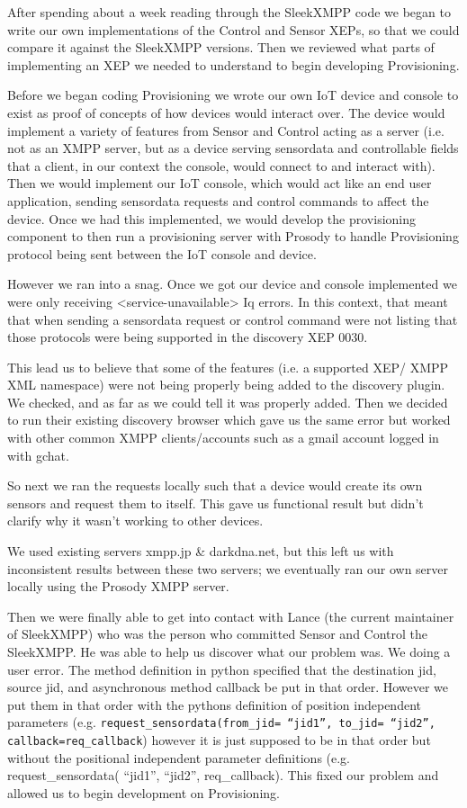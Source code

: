 After spending about a week reading through the SleekXMPP code we began to write
our own implementations of the Control and Sensor XEPs, so that we could compare
it against the SleekXMPP versions. Then we reviewed what parts of implementing
an XEP we needed to understand to begin developing Provisioning.

Before we began coding Provisioning we wrote our own IoT device and console to
exist as proof of concepts of how devices would interact over. The device would
implement a variety of features from Sensor and Control acting as a server (i.e.
not as an XMPP server, but as a device serving sensordata and controllable
fields that a client, in our context the console, would connect to and interact
with). Then we would implement our IoT console, which would act like an end user
application, sending sensordata requests and control commands to affect the
device. Once we had this implemented, we would develop the provisioning
component to then run a provisioning server with Prosody to handle Provisioning
protocol being sent between the IoT console and device.

However we ran into a snag. Once we got our device and console implemented we
were only receiving <service-unavailable> Iq errors. In this context, that meant
that when sending a sensordata request or control command were not listing that
those protocols were being supported in the discovery XEP 0030.

This lead us to believe that some of the features (i.e. a supported XEP/ XMPP
XML namespace)  were not being properly being added to the discovery plugin. We
checked, and as far as we could tell it was properly added. Then we decided to
run their existing discovery browser which gave us the same error but worked
with other common XMPP clients/accounts such as a gmail account logged in with
gchat.

So next we ran the requests locally such that a device would create its own
sensors and request them to itself. This gave us functional result but didn’t
clarify why it wasn’t working to other devices.

We used existing servers xmpp.jp \& darkdna.net, but this left us with
inconsistent results between these two servers; we eventually ran our own server
locally using the Prosody XMPP server.

Then we were finally able to get into contact with Lance (the current maintainer
of SleekXMPP) who was the person who committed Sensor and Control the SleekXMPP.
He was able to help us discover what our problem was. We doing a user error. The
method definition in python specified that the destination jid, source jid, and
asynchronous method callback be put in that order. However we put them in that
order with the pythons definition of position independent parameters (e.g.
\texttt{request\_sensordata(from\_jid= ``jid1'', to\_jid= ``jid2'',
callback=req\_callback})
however it is just supposed to be in that order but without the positional
independent parameter definitions (e.g. request\_sensordata( ``jid1'',  ``jid2'',
req\_callback). This fixed our problem and allowed us to begin development on
Provisioning.

